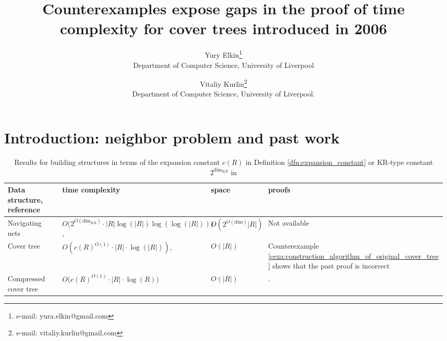 \documentclass{vgtc}                          %
\title{Counterexamples expose gaps in the proof of time complexity for cover trees introduced in 2006}
\author{Yury Elkin\thanks{e-mail: yura.elkin@gmail.com}\\ %
        \scriptsize 
        Department of Computer Science, University of Liverpool %
\and Vitaliy Kurlin\thanks{e-mail: vitaliy.kurlin@gmail.com}\\ %
     \scriptsize Department of Computer Science, University of Liverpool.} %
\numberwithin{algocf}{section}
\theoremstyle{definition}
\theoremstyle{definition}
\theoremstyle{definition}
\theoremstyle{plain}
\begin{document}


\maketitle


\section{Introduction: neighbor problem and past work}

\begin{table}
	\centering
	\caption{Results for building structures in terms of the expansion constant $c(R)$ in Definition \ref{dfn:expansion_constant} or KR-type constant $2^{\text{dim}_{KR}}$ in \cite[Section~2.1]{krauthgamer2004navigating}}
	\label{table:KR:construction}
	\begin{tabular}{|V{4.0cm}|V{5.5cm}|V{2.5cm}|V{4.0cm}|}
		\hline
		Data structure, reference     & time complexity   & space & proofs \\
		\hline
		Navigating nets \cite{krauthgamer2004navigating} & $O\big(2^{O(\text{dim}_{KR})} \cdot |R| \log(|R|) \log(\log(|R|) )\big)$, \cite[Theorem~2.6]{krauthgamer2004navigating} & $O(2^{O(\text{dim})}|R|)$ & Not available \\
		\hline
		Cover tree \cite{beygelzimer2006cover}   &  $O(c(R)^{O(1)} \cdot |R| \cdot \log(|R|))$, \cite[Theorem~6]{beygelzimer2006cover} & $O(|R|)$ & Counterexample \ref{cexa:construction_algorithm_of_original_cover_tree} shows that the past proof is incorrect \\ 
		\hline
		Compressed cover tree \cite{2205.10194} &     $O\big(c(R)^{O(1)} \cdot |R| \cdot \log(R) \big)$  &  $O(|R|)$    & \cite[Theorem~3.52]{2205.10194}. \\
		\hline       
	\end{tabular}
\end{table}
\end{document}
